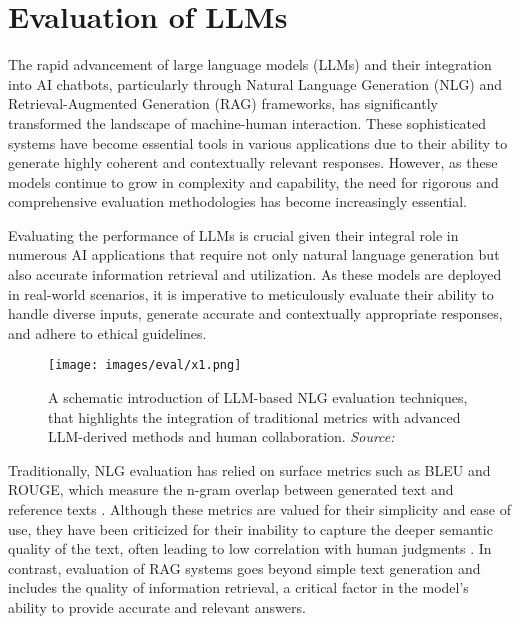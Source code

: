 \section{Evaluation of LLMs}

The rapid advancement of large language models (LLMs) and their integration into AI chatbots, particularly through Natural Language Generation (NLG) and Retrieval-Augmented Generation (RAG) frameworks, has significantly transformed the landscape of machine-human interaction. These sophisticated systems have become essential tools in various applications due to their ability to generate highly coherent and contextually relevant responses. However, as these models continue to grow in complexity and capability, the need for rigorous and comprehensive evaluation methodologies has become increasingly essential.

Evaluating the performance of LLMs is crucial given their integral role in numerous AI applications that require not only natural language generation but also accurate information retrieval and utilization. As these models are deployed in real-world scenarios, it is imperative to meticulously evaluate their ability to handle diverse inputs, generate accurate and contextually appropriate responses, and adhere to ethical guidelines.

\begin{figure}[h!]
    \centering
    \texttt{[image: images/eval/x1.png]}
    \caption{A schematic introduction of LLM-based NLG evaluation techniques, that highlights the integration of traditional metrics with advanced LLM-derived methods and human collaboration. \textit{Source:} \cite{gao2024llm}}
    \label{fig:evaluation_pipeline}
\end{figure}

Traditionally, NLG evaluation has relied on surface metrics such as BLEU and ROUGE, which measure the n-gram overlap between generated text and reference texts \cite{papineni2002bleu, lin2004rouge}. Although these metrics are valued for their simplicity and ease of use, they have been criticized for their inability to capture the deeper semantic quality of the text, often leading to low correlation with human judgments \cite{sulem2018bleu}. In contrast, evaluation of RAG systems goes beyond simple text generation and includes the quality of information retrieval, a critical factor in the model's ability to provide accurate and relevant answers.

